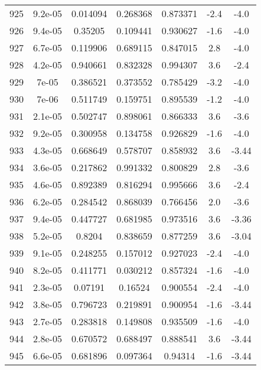\begin{table}
\begin{tabular}{c|c|c|c|c|c|c}
925 & 9.2e-05 & 0.014094 & 0.268368 & 0.873371 & -2.4 & -4.0\\
926 & 9.4e-05 & 0.35205 & 0.109441 & 0.930627 & -1.6 & -4.0\\
927 & 6.7e-05 & 0.119906 & 0.689115 & 0.847015 & 2.8 & -4.0\\
928 & 4.2e-05 & 0.940661 & 0.832328 & 0.994307 & 3.6 & -2.4\\
929 & 7e-05 & 0.386521 & 0.373552 & 0.785429 & -3.2 & -4.0\\
930 & 7e-06 & 0.511749 & 0.159751 & 0.895539 & -1.2 & -4.0\\
931 & 2.1e-05 & 0.502747 & 0.898061 & 0.866333 & 3.6 & -3.6\\
932 & 9.2e-05 & 0.300958 & 0.134758 & 0.926829 & -1.6 & -4.0\\
933 & 4.3e-05 & 0.668649 & 0.578707 & 0.858932 & 3.6 & -3.44\\
934 & 3.6e-05 & 0.217862 & 0.991332 & 0.800829 & 2.8 & -3.6\\
935 & 4.6e-05 & 0.892389 & 0.816294 & 0.995666 & 3.6 & -2.4\\
936 & 6.2e-05 & 0.284542 & 0.868039 & 0.766456 & 2.0 & -3.6\\
937 & 9.4e-05 & 0.447727 & 0.681985 & 0.973516 & 3.6 & -3.36\\
938 & 5.2e-05 & 0.8204 & 0.838659 & 0.877259 & 3.6 & -3.04\\
939 & 9.1e-05 & 0.248255 & 0.157012 & 0.927023 & -2.4 & -4.0\\
940 & 8.2e-05 & 0.411771 & 0.030212 & 0.857324 & -1.6 & -4.0\\
941 & 2.3e-05 & 0.07191 & 0.16524 & 0.900554 & -2.4 & -4.0\\
942 & 3.8e-05 & 0.796723 & 0.219891 & 0.900954 & -1.6 & -3.44\\
943 & 2.7e-05 & 0.283818 & 0.149808 & 0.935509 & -1.6 & -4.0\\
944 & 2.8e-05 & 0.670572 & 0.688497 & 0.888541 & 3.6 & -3.44\\
945 & 6.6e-05 & 0.681896 & 0.097364 & 0.94314 & -1.6 & -3.44\\
\end{tabular}
\end{table}
\newpage
